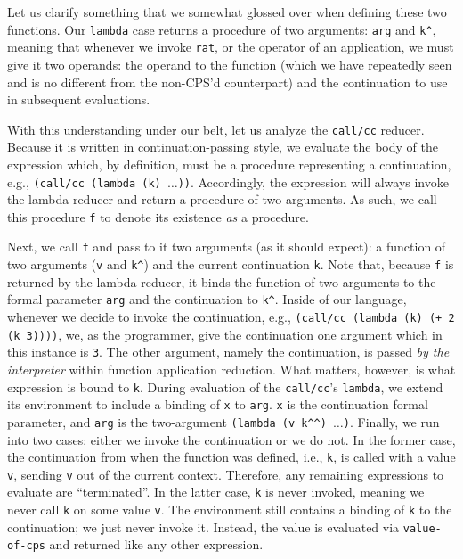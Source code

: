 Let us clarify something that we somewhat glossed over when defining these two functions. Our \texttt{lambda} case returns a procedure of two arguments: \texttt{arg} and \texttt{k\^{}}, meaning that whenever we invoke \texttt{rat}, or the operator of an application, we must give it two operands: the operand to the function (which we have repeatedly seen and is no different from the non-CPS'd counterpart) and the continuation to use in subsequent evaluations. 

With this understanding under our belt, let us analyze the \texttt{call/cc} reducer. Because it is written in continuation-passing style, we evaluate the body of the expression which, by definition, must be a procedure representing a continuation, e.g., \texttt{(call/cc (lambda (k) $\ldots$))}. Accordingly, the expression will always invoke the lambda reducer and return a procedure of two arguments. As such, we call this procedure \texttt{f} to denote its existence \textit{as} a procedure. 

Next, we call \texttt{f} and pass to it two arguments (as it should expect): a function of two arguments (\texttt{v} and \texttt{k\^{}}) and the current continuation \texttt{k}. Note that, because \texttt{f} is returned by the lambda reducer, it binds the function of two arguments to the formal parameter \texttt{arg} and the continuation to \texttt{k\^}. Inside of our language, whenever we decide to invoke the continuation, e.g., \texttt{(call/cc (lambda (k) (+ 2 (k 3))))}, we, as the programmer, give the continuation one argument which in this instance is \texttt{3}. The other argument, namely the continuation, is passed \textit{by the interpreter} within function application reduction. What matters, however, is what expression is bound to \texttt{k}. During evaluation of the \texttt{call/cc}'s \texttt{lambda}, we extend its environment to include a binding of \texttt{x} to \texttt{arg}. \texttt{x} is the continuation formal parameter, and \texttt{arg} is the two-argument \texttt{(lambda (v k\^{}\^{}) $\ldots$)}. Finally, we run into two cases: either we invoke the continuation or we do not. In the former case, the continuation from when the function was defined, i.e., \texttt{k}, is called with a value \texttt{v}, sending \texttt{v} out of the current context. Therefore, any remaining expressions to evaluate are ``terminated''. In the latter case, \texttt{k} is never invoked, meaning we never call \texttt{k} on some value \texttt{v}. The environment still contains a binding of \texttt{k} to the continuation; we just never invoke it. Instead, the value is evaluated via \texttt{value-of-cps} and returned like any other expression.

